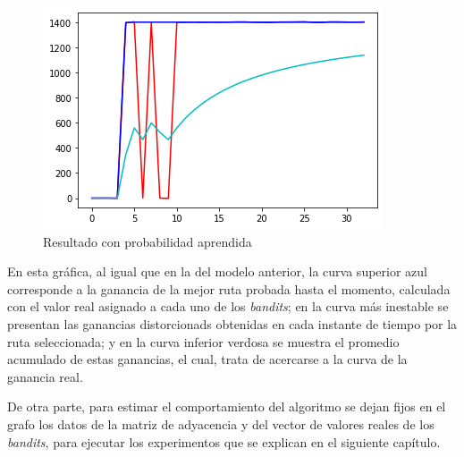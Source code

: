 \begin{figure} [H]
	\centering
	\includegraphics[scale=1]{Resul2}
	\caption{Resultado con probabilidad aprendida}
	\label{Resul2}
\end{figure}
En esta gráfica, al igual que en la del modelo anterior, la curva superior azul corresponde a la ganancia de la mejor ruta probada hasta el momento, calculada con el valor real asignado a cada uno de los \textit{bandits}; en la curva más inestable se presentan las ganancias distorcionads obtenidas en cada instante de tiempo por la ruta seleccionada; y en la curva inferior verdosa se muestra el promedio acumulado de estas ganancias, el cual, trata de acercarse a la curva de la ganancia real. 

De otra parte, para estimar el comportamiento del algoritmo se dejan fijos en el grafo los datos de la matriz de adyacencia y del vector de valores reales de los \textit{bandits}, para ejecutar los experimentos que se explican en el siguiente capítulo.



